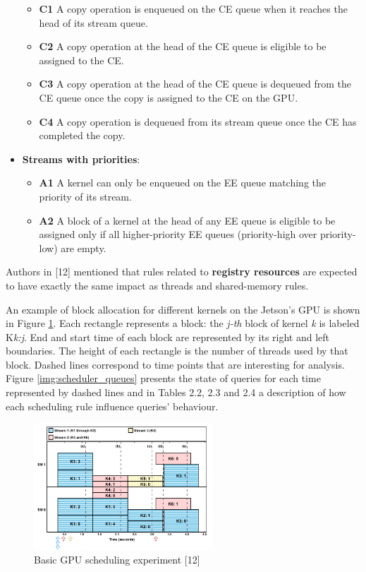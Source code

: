 \documentclass[
  12pt,
  a4paperpaper,
]{report}
\providecommand{\tightlist}{%
  \setlength{\itemsep}{0pt}\setlength{\parskip}{0pt}}
\begin{document}
\begin{itemize}
  \begin{itemize}
  \tightlist
  \item
    \textbf{C1} A copy operation is enqueued on the CE queue when it
    reaches the head of its stream queue.
  \item
    \textbf{C2} A copy operation at the head of the CE queue is eligible
    to be assigned to the CE.
  \item
    \textbf{C3} A copy operation at the head of the CE queue is dequeued
    from the CE queue once the copy is assigned to the CE on the GPU.
  \item
    \textbf{C4} A copy operation is dequeued from its stream queue once
    the CE has completed the copy.
  \end{itemize}
\item
  \textbf{Streams with priorities}:

  \begin{itemize}
  \tightlist
  \item
    \textbf{A1} A kernel can only be enqueued on the EE queue matching
    the priority of its stream.
  \item
    \textbf{A2} A block of a kernel at the head of any EE queue is
    eligible to be assigned only if all higher-priority EE queues
    (priority-high over priority-low) are empty.
  \end{itemize}
\end{itemize}

Authors in {[}12{]} mentioned that rules related to \textbf{registry
resources} are expected to have exactly the same impact as threads and
shared-memory rules.

An example of block allocation for different kernels on the Jetson's GPU  is shown in Figure \ref{img:scheduler_blocks}.
Each rectangle represents a block: the \textit{j-th} block of kernel \textit{k} is labeled K\textit{k:j}. 
End and start time of each block are represented by its right and left boundaries. 
The height of each rectangle is the number of threads used by that block.
Dashed lines correspond to time points that are interesting for analysis. 
Figure \ref{img:scheduler_queues} presents the state of queries for each time represented by dashed lines and in Tables 2.2, 2.3 and 2.4 a description of how each  scheduling rule influence queries' behaviour.

\begin{figure}
\centering
\includegraphics[width=0.6\textwidth,height=\textheight]{source/figures/scheduler_blocks.png}
\caption{Basic GPU scheduling experiment {[}12{]}
\label{img:scheduler_blocks}}
\end{figure}
\end{document}
